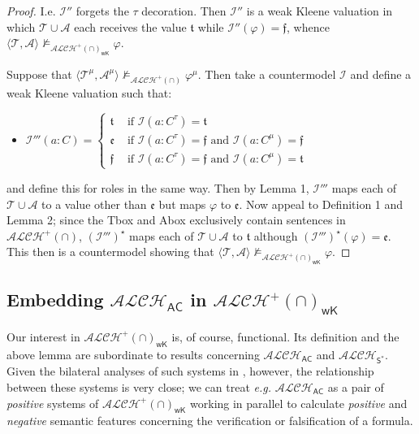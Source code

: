 \documentclass[letterpaper]{article} %
\theoremstyle{definition}
\theoremstyle{definition}
\theoremstyle{definition}
\theoremstyle{definition}
\theoremstyle{definition}
\begin{document}
\begin{proof}
    \noindent I.e. $\mathcal{I}''$ forgets the $\tau$ decoration. Then $\mathcal{I}''$ is a weak Kleene valuation in which $\mathcal{T}\cup\mathcal{A}$ each receives the value $\mathfrak{t}$ while $\mathcal{I}''(\varphi)=\mathfrak{f}$, whence $\langle\mathcal{T},\mathcal{A}\rangle\nvDash_{\mathcal{ALCH}^+(\cap)_{\mathsf{wK}}}\varphi$.

    Suppose that $\langle \mathcal{T}^{\mu},\mathcal{A}^{\mu}\rangle\nvDash_{\mathcal{ALCH}^+(\cap)}\varphi^{\mu}$. Then take a countermodel $\mathcal{I}$ and define a weak Kleene valuation such that: 

        \begin{center}
        \begin{itemize}
        \item $\mathcal{I}'''(a:C)=\begin{cases}
            
        \mathfrak{t} & \mbox{ if }\mathcal{I}(a:C^{\tau})=\mathfrak{t}\\
        \mathfrak{e} & \mbox{ if }\mathcal{I}(a:C^{\tau})=\mathfrak{f}\mbox{ and }\mathcal{I}(a:C^{\mu})=\mathfrak{f}\\
        \mathfrak{f} & \mbox{ if }\mathcal{I}(a:C^{\tau})=\mathfrak{f}\mbox{ and }\mathcal{I}(a:C^{\mu})=\mathfrak{t}
        \end{cases}
        $
        \end{itemize}
    \end{center}

    \noindent and define this for roles in the same way. Then by Lemma 1, $\mathcal{I}'''$ maps each of $\mathcal{T}\cup\mathcal{A}$ to a value other than $\mathfrak{e}$ but maps $\varphi$ to $\mathfrak{e}$. Now appeal to Definition 1 and Lemma 2; since the Tbox and Abox exclusively contain sentences in $\mathcal{ALCH^+(\cap)}$, $(\mathcal{I}''')^{\star}$ maps each of $\mathcal{T}\cup\mathcal{A}$ to $\mathfrak{t}$ although $(\mathcal{I}''')^{\star}(\varphi)=\mathfrak{e}$. This then is a countermodel showing that $\langle\mathcal{T},\mathcal{A}\rangle\nvDash_{\mathcal{ALCH}^+(\cap)_{\mathsf{wK}}}\varphi$.
\end{proof}

\subsection{Embedding $\mathcal{ALCH}_{\mathsf{AC}}$ in $\mathcal{ALCH}^+(\cap)_{\mathsf{wK}}$}

Our interest in $\mathcal{ALCH}^+(\cap)_{\mathsf{wK}}$ is, of course, functional. Its definition and the above lemma are subordinate to results concerning $\mathcal{ALCH}_{\mathsf{AC}}$ and $\mathcal{ALCH}_{\mathsf{S}^*}$. Given the bilateral analyses of such systems in \cite{DBLP:journals/logcom/Ferguson16}, however, the relationship between these systems is very close; we can treat \emph{e.g.} $\mathcal{ALCH}_{\mathsf{AC}}$ as a pair of \emph{positive} systems of $\mathcal{ALCH}^+(\cap)_{\mathsf{wK}}$ working in parallel to calculate \emph{positive} and \emph{negative} semantic features concerning the verification or falsification of a formula.
\end{document}
